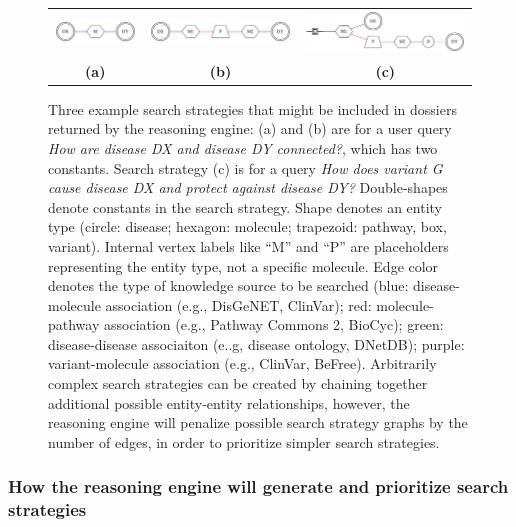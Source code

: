 \documentclass[11pt,notitlepage]{article}
\begin{document}
\begin{figure}[h!]
  \begin{tabular}{ccc}
    \includegraphics[width=1.2in]{net6.png} &
    \includegraphics[width=2.2in]{net7.png} & 
    \includegraphics[width=2.5in]{net8.png} \\
                    {\bf (a)} & {\bf (b)} & {\bf (c)}
                    \end{tabular}
  \caption{Three example search strategies that might be included in dossiers
    returned by the reasoning engine: (a) and (b) are for a user query {\em How
      are disease DX and disease DY connected?\/}, which has two constants.
    Search strategy (c) is for a query {\em How does variant G cause disease DX
      and protect against disease DY?}  Double-shapes denote constants in the
    search strategy. Shape denotes an entity type (circle: disease; hexagon:
    molecule; trapezoid: pathway, box, variant). Internal vertex labels like
    ``M'' and ``P'' are placeholders representing the entity type, not a
    specific molecule. Edge color denotes the type of knowledge source to be
    searched (blue: disease-molecule association (e.g., DisGeNET, ClinVar); red:
    molecule-pathway association (e.g., Pathway Commons 2, BioCyc); green:
    disease-disease associaiton (e..g, disease ontology, DNetDB); purple:
    variant-molecule association (e.g., ClinVar, BeFree). Arbitrarily complex
    search strategies can be created by chaining together additional possible
    entity-entity relationships, however, the reasoning engine will penalize
    possible search strategy graphs by the number of edges, in order to
    prioritize simpler search strategies.}
  \label{fig:ugraph}
\end{figure}

\subsubsection{How the reasoning engine will generate and prioritize search
  strategies}
\end{document}
